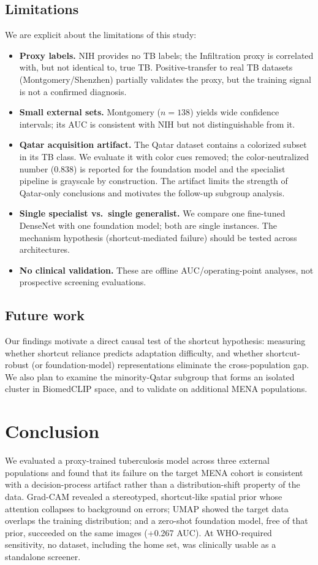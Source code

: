 \documentclass[runningheads]{llncs}
\begin{document}
\subsection{Limitations}
We are explicit about the limitations of this study:
\begin{itemize}
\item \textbf{Proxy labels.} NIH provides no TB labels; the Infiltration proxy is correlated with, but not identical to, true TB. Positive-transfer to real TB datasets (Montgomery/Shenzhen) partially validates the proxy, but the training signal is not a confirmed diagnosis.
\item \textbf{Small external sets.} Montgomery ($n=138$) yields wide confidence intervals; its AUC is consistent with NIH but not distinguishable from it.
\item \textbf{Qatar acquisition artifact.} The Qatar dataset contains a colorized subset in its TB class. We evaluate it with color cues removed; the color-neutralized number (0.838) is reported for the foundation model and the specialist pipeline is grayscale by construction. The artifact limits the strength of Qatar-only conclusions and motivates the follow-up subgroup analysis.
\item \textbf{Single specialist vs.\ single generalist.} We compare one fine-tuned DenseNet with one foundation model; both are single instances. The mechanism hypothesis (shortcut-mediated failure) should be tested across architectures.
\item \textbf{No clinical validation.} These are offline AUC/operating-point analyses, not prospective screening evaluations.
\end{itemize}

\subsection{Future work}
Our findings motivate a direct causal test of the shortcut hypothesis: measuring whether shortcut reliance predicts adaptation difficulty, and whether shortcut-robust (or foundation-model) representations eliminate the cross-population gap. We also plan to examine the minority-Qatar subgroup that forms an isolated cluster in BiomedCLIP space, and to validate on additional MENA populations.

\section{Conclusion}
We evaluated a proxy-trained tuberculosis model across three external populations and found that its failure on the target MENA cohort is consistent with a decision-process artifact rather than a distribution-shift property of the data. Grad-CAM revealed a stereotyped, shortcut-like spatial prior whose attention collapses to background on errors; UMAP showed the target data overlaps the training distribution; and a zero-shot foundation model, free of that prior, succeeded on the same images (+0.267 AUC). At WHO-required sensitivity, no dataset, including the home set, was clinically usable as a standalone screener.
\end{document}
